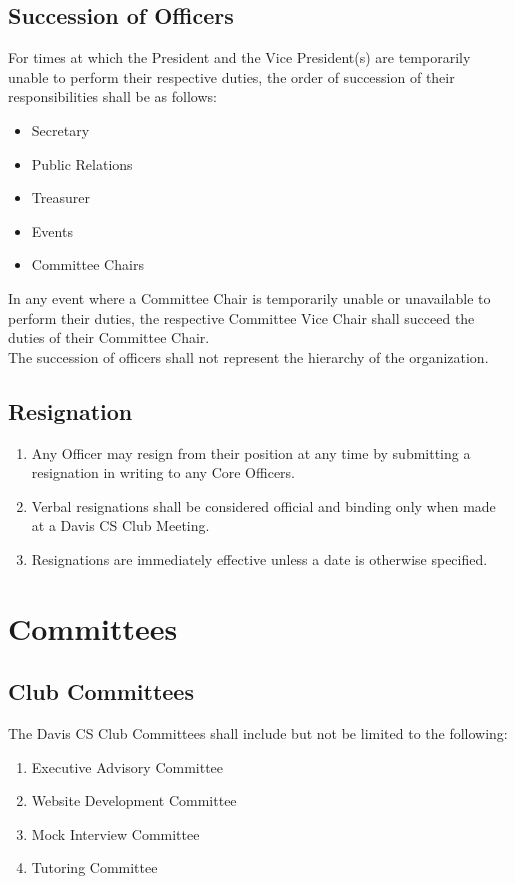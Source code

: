 \documentclass{article}
\newenvironment{li}{
\begin{enumerate}
  \setlength{\itemsep}{1pt}
  \setlength{\parskip}{0pt}
  \setlength{\parsep}{0pt}
}{\end{enumerate}}
\begin{document}
\subsection{Succession of Officers}
For times at which the President and the Vice President(s) are temporarily unable to perform their respective duties, the order of succession of their responsibilities shall be as follows:
\begin{itemize}
  \setlength{\itemsep}{1pt}
  \setlength{\parskip}{0pt}
  \setlength{\parsep}{0pt}
\item Secretary
\item Public Relations
\item Treasurer
\item Events
\item Committee Chairs
\end{itemize}
In any event where a Committee Chair is temporarily unable or unavailable to perform their duties, the respective Committee Vice Chair shall succeed the duties of their Committee Chair.\\

\noindent The succession of officers shall not represent the hierarchy of the organization.

\subsection{Resignation}
\begin{li}
\item Any Officer may resign from their position at any time by submitting a resignation in writing to any Core Officers.
\item Verbal resignations shall be considered official and binding only when made at a Davis CS Club Meeting.
\item Resignations are immediately effective unless a date is otherwise specified.
\end{li}


\section{Committees}
\subsection{Club Committees}
The Davis CS Club Committees shall include but not be limited to the following:
\begin{li}
\item Executive Advisory Committee
\item Website Development Committee
\item Mock Interview Committee
\item Tutoring Committee
\end{li}
\end{document}
